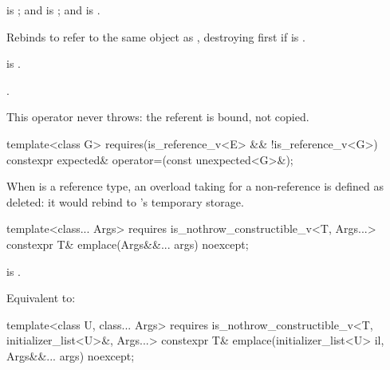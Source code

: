 \begin{itemdescr}
\pnum
\constraints
{} is ; and  is ; and  is .

\pnum
\effects
Rebinds  to refer to the same object as , destroying  first if  is .

\pnum
\ensures
{} is .

\pnum
\returns
{}.

\pnum
\remarks
This operator never throws: the referent is bound, not copied.
\end{itemdescr}

%
\begin{itemdecl}
template<class G>
  requires(is_reference_v<E> && !is_reference_v<G>)
constexpr expected& operator=(const unexpected<G>&);
\end{itemdecl}

\begin{itemdescr}
\pnum
\remarks
When  is a reference type, an overload taking  for a non-reference  is defined as deleted: it would rebind  to 's temporary storage.
\end{itemdescr}

%
\begin{itemdecl}
template<class... Args>
  requires is_nothrow_constructible_v<T, Args...>
constexpr T& emplace(Args&&... args) noexcept;
\end{itemdecl}

\begin{itemdescr}
\pnum
\constraints
{} is .

\pnum
\effects
Equivalent to: 
\end{itemdescr}

%
\begin{itemdecl}
template<class U, class... Args>
  requires is_nothrow_constructible_v<T, initializer_list<U>&, Args...>
constexpr T& emplace(initializer_list<U> il, Args&&... args) noexcept;
\end{itemdecl}

